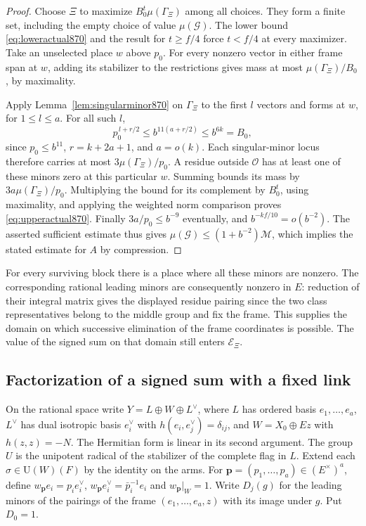 \documentclass[a4paper,11pt]{article}
\theoremstyle{definition}
\theoremstyle{remark}
\numberwithin{equation}{section}
\begin{document}
\begin{proof}
Choose \(\Xi\) to maximize \(B_0^t\mu(\Gamma_\Xi)\) among
all choices. They form a finite set, including the empty
choice of value \(\mu(\mathcal G)\). The lower bound
\eqref{eq:loweractual870} and the result for \(t\ge f/4\)
force \(t<f/4\) at every maximizer. Take an unselected place
\(w\) above \(p_0\). For every nonzero vector in either frame
span at \(w\), adding its stabilizer to the restrictions gives
mass at most \(\mu(\Gamma_\Xi)/B_0\), by maximality.

Apply Lemma~\ref{lem:singularminor870} on \(\Gamma_\Xi\) to the
first \(l\) vectors and forms at \(w\), for \(1\le l\le a\).
For all such \(l\),
\[
       p_0^{\,l+r/2}
       \le b^{11(a+r/2)}\le b^{6k}=B_0,
\]
since \(p_0\le b^{11}\), \(r=k+2a+1\), and \(a=o(k)\).
Each singular-minor locus therefore carries at most
\(3\mu(\Gamma_\Xi)/p_0\). A residue outside \(\mathcal O\)
has at least one of these minors zero at this particular \(w\).
Summing bounds its mass by \(3a\mu(\Gamma_\Xi)/p_0\).
Multiplying the bound for its complement by \(B_0^t\),
using maximality, and applying the weighted norm comparison
proves \eqref{eq:upperactual870}. Finally \(3a/p_0\le b^{-9}\)
eventually, and \(b^{-kf/10}=o(b^{-2})\). The asserted
sufficient estimate thus gives
\(\mu(\mathcal G)\le(1+b^{-2})\mathcal M\), which implies
the stated estimate for \(A\) by compression.
\end{proof}

For every surviving block there is a place where all these
minors are nonzero. The corresponding rational leading minors
are consequently nonzero in \(E\): reduction of their integral
matrix gives the displayed residue pairing since the two
class representatives belong to the middle group and fix the
frame. This supplies the domain on which successive elimination
of the frame coordinates is possible. The value of the signed
sum on that domain still enters \(\mathcal E_\Xi\).
\clearpage

\subsection{Factorization of a signed sum with a fixed link}
\label{sec:orbitfactors871}

On the rational space write \(Y=L\oplus W\oplus L^\vee\), where
\(L\) has ordered basis \(e_1,\ldots,e_a\), \(L^\vee\) has dual
isotropic basis \(e_i^\vee\) with \(h(e_i,e_j^\vee)=\delta_{ij}\),
and \(W=X_0\oplus Ez\) with \(h(z,z)=-N\). The Hermitian form
is linear in its second argument. The group \(U\) is the unipotent
radical of the stabilizer of the complete flag in \(L\). Extend
each \(\sigma\in\mathrm U(W)(F)\) by the identity on the arms.
For \(\mathbf p=(p_1,\ldots,p_a)\in(E^\times)^a\), define
\(w_{\mathbf p}e_i=p_i e_i^\vee\),
\(w_{\mathbf p}e_i^\vee=\bar p_i^{-1}e_i\) and
\(w_{\mathbf p}|_W=1\). Write \(D_j(g)\) for the leading minors
of the pairings of the frame \((e_1,\ldots,e_a,z)\) with its
image under \(g\). Put \(D_0=1\).
\end{document}
